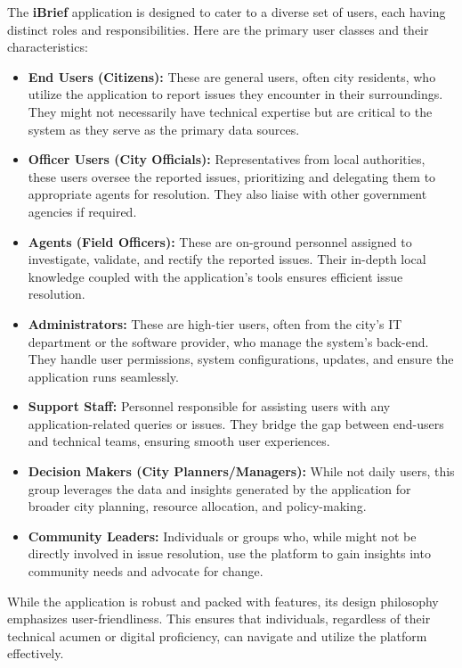 The \textbf{iBrief} application is designed to cater to a diverse set of users, each having distinct roles and responsibilities. Here are the primary user classes and their characteristics:

\begin{itemize}
    \item \textbf{End Users (Citizens):} These are general users, often city residents, who utilize the application to report issues they encounter in their surroundings. They might not necessarily have technical expertise but are critical to the system as they serve as the primary data sources.

    \item \textbf{Officer Users (City Officials):} Representatives from local authorities, these users oversee the reported issues, prioritizing and delegating them to appropriate agents for resolution. They also liaise with other government agencies if required.

    \item \textbf{Agents (Field Officers):} These are on-ground personnel assigned to investigate, validate, and rectify the reported issues. Their in-depth local knowledge coupled with the application's tools ensures efficient issue resolution.

    \item \textbf{Administrators:} These are high-tier users, often from the city's IT department or the software provider, who manage the system's \gls{back-end}. They handle user permissions, system configurations, updates, and ensure the application runs seamlessly.

    \item \textbf{Support Staff:} Personnel responsible for assisting users with any application-related queries or issues. They bridge the gap between end-users and technical teams, ensuring smooth user experiences.

    \item \textbf{Decision Makers (City Planners/Managers):} While not daily users, this group leverages the data and insights generated by the application for broader city planning, resource allocation, and policy-making.

    \item \textbf{Community Leaders:} Individuals or groups who, while might not be directly involved in issue resolution, use the platform to gain insights into community needs and advocate for change.

\end{itemize}

While the application is robust and packed with features, its design philosophy emphasizes user-friendliness. This ensures that individuals, regardless of their technical acumen or digital proficiency, can navigate and utilize the platform effectively.

